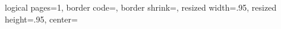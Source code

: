 


\usepackage{enumitem}

\usepackage{xltabular}

\usepackage[T1]{fontenc}
\usepackage[sfdefault]{atkinson}

\newcommand{\todo}[1][finish]{%
  {\Large\hl{\textbf{TODO: #1}}}%
}

\usepackage{pgf}
\usepackage{pgfpages}
{
  \edef\pgfpageoptionborder{0pt}
}
{
  \pgfpagesphysicalpageoptions
  {%
    logical pages=1,%
  }
  {
    border code=\pgfsetlinewidth{2pt}\pgfstroke,%
    border shrink=\pgfpageoptionborder,%
    resized width=.95\pgfphysicalwidth,%
    resized height=.95\pgfphysicalheight,%
    center=\pgfpoint{.5\pgfphysicalwidth}{.5\pgfphysicalheight}%
  }%
}


